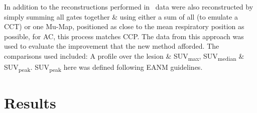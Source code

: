         In addition to the reconstructions performed in~ data were also reconstructed by simply summing all gates together \& using either a sum of all  (to emulate a \gls{CCT}) or one \gls{Mu-Map}, positioned as close to the mean respiratory position as possible, for \gls{AC}, this process matches \gls{CCP}. The data from this approach was used to evaluate the improvement that the new method afforded. The comparisons used included: A profile over the lesion \& \gls{SUV}\textsubscript{max}, \gls{SUV}\textsubscript{median} \& \gls{SUV}\textsubscript{peak}. \gls{SUV}\textsubscript{peak} here was defined following \gls{EANM} guidelines.%

\section{Results} \label{sec:results}
    
    
